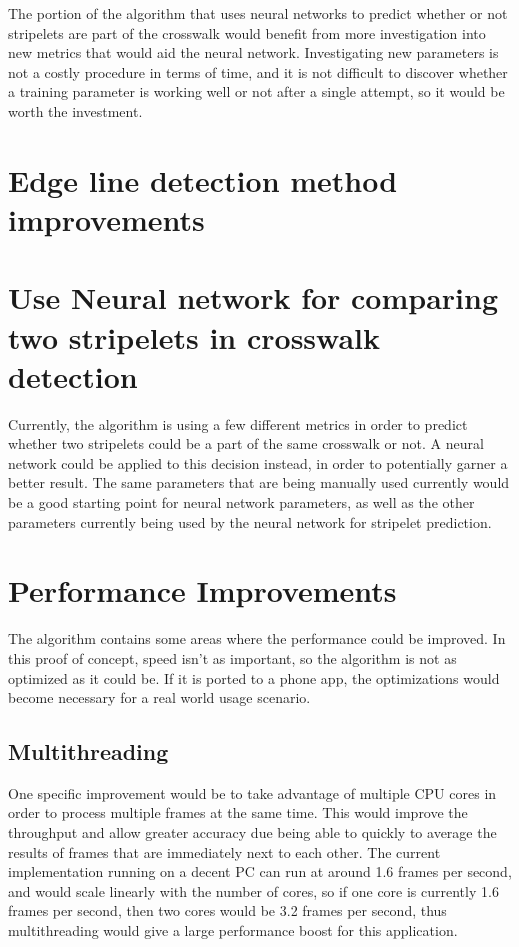 \documentclass[12pt]{ucthesis}
\begin{document}
{The portion of the algorithm that uses neural networks to predict whether or not stripelets are part of the crosswalk would benefit from more investigation into new metrics that would aid the neural network. Investigating new parameters is not a costly procedure in terms of time, and it is not difficult to discover whether a training parameter is working well or not after a single attempt, so it would be worth the investment.  

\section{Edge line detection method improvements}


\section{Use Neural network for comparing two stripelets in crosswalk detection}

Currently, the algorithm is using a few different metrics in order to predict whether two stripelets could be a part of the same crosswalk or not. A neural network could be applied to this decision instead, in order to potentially garner a better result. The same parameters that are being manually used currently would be a good starting point for neural network parameters, as well as the other parameters currently being used by the neural network for stripelet prediction. 


\section{Performance Improvements}

The algorithm contains some areas where the performance could be improved. In this proof of concept, speed isn't as important, so the algorithm is not as optimized as it could be. If it is ported to a phone app, the optimizations would become necessary for a real world usage scenario.
\subsection{Multithreading}
One specific improvement would be to take advantage of multiple CPU cores in order to process multiple frames at the same time. This would improve the throughput and allow greater accuracy due being able to quickly to average the results of frames that are immediately next to each other.
The current implementation running on a decent PC can run at around 1.6 frames per second, and would scale linearly with the number of cores, so if one core is currently 1.6 frames per second, then two cores would be 3.2 frames per second, thus multithreading would give a large performance boost for this application.

}
\end{document}

